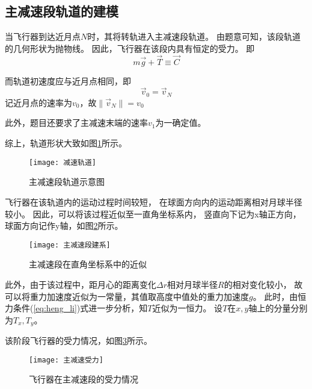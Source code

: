 \documentclass[withoutpreface,bwprint]{cumcmthesis} %
\begin{document}
    \subsection{主减速段轨道的建模}
    当飞行器到达近月点$N$时，其将转轨进入主减速段轨道。
    由题意可知，该段轨道的几何形状为抛物线。
    因此，飞行器在该段内具有恒定的受力。
    即
    \begin{equation}
        m\vec{g} + \vec{T} \equiv \vec{C}
        \label{eq:heng_li}
    \end{equation}


    而轨道初速度应与近月点相同，即
    \[
        \vec{v}_0 = \vec{v}_N
    \]
    记近月点的速率为$v_0$，故$\| \vec{v}_N \| = v_0$


    此外，题目还要求了主减速末端的速率$v_1$为一确定值。


    综上，轨道形状大致如图\ref{fig:jian_su_gui_dao}所示。
    \begin{figure}[!h]
        \centering
        \texttt{[image: 减速轨道]}
        \caption{主减速段轨道示意图}
        \label{fig:jian_su_gui_dao}
    \end{figure}

    
    飞行器在该轨道内的运动过程时间较短，
    在球面方向内的运动距离相对月球半径较小。
    因此，可以将该过程近似至一直角坐标系内，
    竖直向下记为x轴正方向，球面方向记作y轴，如图\ref{fig:zhu_jian_su_duan_jian_xi}所示。
    \begin{figure}[!h]
        \centering
        \texttt{[image: 主减速段建系]}
        \caption{主减速段在直角坐标系中的近似}
        \label{fig:zhu_jian_su_duan_jian_xi}
    \end{figure}


    此外，由于该过程中，距月心的距离变化$\Delta r$相对月球半径$R$的相对变化较小，
    故可以将重力加速度近似为一常量，其值取高度中值处的重力加速度$g$。
    此时，由恒力条件(\ref{eq:heng_li})式进一步分析，知$T$近似为一恒力。
    设$T$在$x,y$轴上的分量分别为$T_x, T_y$。
    

    该阶段飞行器的受力情况，如图\ref{fig:zhu_jian_su_shou_li}所示。
    \begin{figure}[!h]
        \centering
        \texttt{[image: 主减速受力]}
        \caption{飞行器在主减速段的受力情况}
        \label{fig:zhu_jian_su_shou_li}
    \end{figure}
\end{document}
